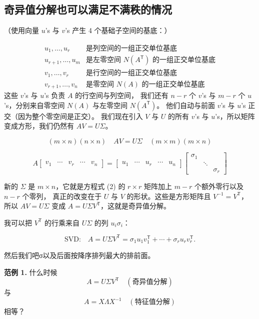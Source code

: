 \subsection{奇异值分解也可以满足不满秩的情况}
（使用向量 $u$’s 与 $v$’s 产生 4 个基础子空间的基底：）

\[
\begin{array}{ll}
u_1, \ldots, u_r & \text{是列空间的一组正交单位基底} \\
u_{r+1}, \ldots, u_m & \text{是左零空间 } N(A^{\mathsf T}) \text{ 的一组正交单位基底} \\
v_1, \ldots, v_r & \text{是行空间的一组正交单位基底} \\
v_{r+1}, \ldots, v_n & \text{是零空间 } N(A) \text{ 的一组正交单位基底}
\end{array}
\]
这些 $v$’s 与 $u$’s 负责 $A$ 的行空间与列空间，  
我们还有 $n-r$ 个 $v$’s 与 $m-r$ 个 $u$’s，分别来自零空间 $N(A)$ 与左零空间 $N(A^{\mathsf T})$。  
他们自动与前面 $v$’s 与 $u$’s 正交（因为整个零空间是正交）。  
我们现在引入 $V$ 与 $U$ 的所有 $v$’s 与 $u$’s，所以矩阵变成方形，我们仍然有 $AV = U\Sigma$。

\[
(m \times n)(n \times n) \quad AV = U \Sigma \quad (m \times m)(m \times n)
\]

\[
A \begin{bmatrix} v_1 & \cdots & v_r & \cdots & v_n \end{bmatrix}
= \begin{bmatrix} u_1 & \cdots & u_r & \cdots & u_n \end{bmatrix}
\begin{bmatrix}
\sigma_1 & & \\
& \ddots & \\
& & \sigma_r
\end{bmatrix}
\tag{3}
\]

新的 $\Sigma$ 是 $m \times n$，它就是方程式 (2) 的 $r \times r$ 矩阵加上 $m-r$ 个额外零行以及 $n-r$ 个零列，  
真正的改变在于 $U$ 与 $V$ 的形状。这些是方形矩阵且 $V^{-1}=V^{\mathsf T}$，  
所以 $AV = U\Sigma$ 变成 $A = U \Sigma V^{\mathsf T}$，这就是奇异值分解。  

我可以把 $V^{\mathsf T}$ 的行乘来自 $U\Sigma$ 的列 $u_i\sigma_i$：

\[
\text{SVD:} \quad
A = U \Sigma V^{\mathsf T}
= \sigma_1 u_1 v_1^{\mathsf T} + \cdots + \sigma_r u_r v_r^{\mathsf T}.
\tag{4}
\]

然后我们吧σ以及后面按降序排列最大的排前面。

\textbf{范例 1.} 什么时候 
\[
A = U \Sigma V^{\mathsf T} \quad (\text{奇异值分解})
\]
与
\[
A = X \Lambda X^{-1} \quad (\text{特征值分解})
\]
相等？

